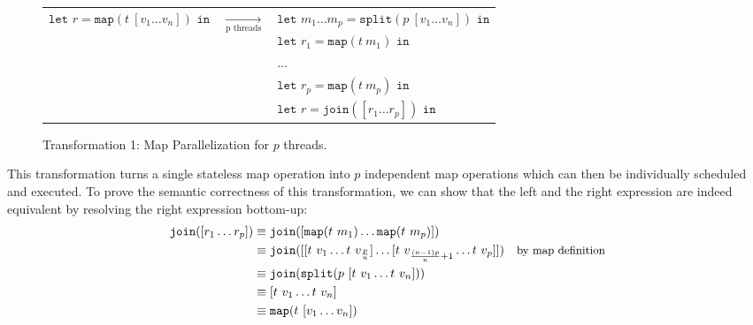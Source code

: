 \begin{figure}[h]
    \begin{tabular}{l c l}
        \multirow{5}{*}{$\texttt{let } r = \texttt{map} (t\ [v_1 \dots v_n]) \texttt{ in}$} & \multirow{5}{*}{$\underset{\text{p threads}}{\longrightarrow}$} & $\texttt{let } m_1 \dots m_p = \texttt{split} (p\ [v_1 \dots v_n]) \texttt{ in}$\\
                                                                                            &&\hspace*{.3cm} $\texttt{let } r_1 = \texttt{map} (t\ m_1) \texttt{ in}$\\
                                                                                            &&\hspace*{.6cm} $\dots$\\
                                                                                            &&\hspace*{.9cm} $\texttt{let } r_p = \texttt{map} (t\ m_p) \texttt{ in}$\\
                                                                                            &&\hspace*{1.2cm} $\texttt{let } r = \texttt{join} ([r_1 \dots r_p]) \texttt{ in}$\\
    \end{tabular}
    \caption{Transformation 1: Map Parallelization for $p$ threads.}%
    \label{fig:transformations:tf1}
\end{figure}

This transformation turns a single stateless map operation into $p$ independent map operations which can then be individually scheduled and executed.
To prove the semantic correctness of this transformation, we can show that the left and the right expression are indeed equivalent by resolving the right expression bottom-up:
\begin{align*}
    \texttt{join} ([r_1 \dots r_p]) &\equiv \texttt{join} ([\texttt{map} (t\ m_1) \dots \texttt{map} (t\ m_p)])\\
                                    &\equiv \texttt{join} ([[t\ v_1 \dots t\ v_{\frac{p}{n}}] \dots [t\ v_{\frac{(n-1) p}{n} + 1} \dots t\ v_p]])& \text{\small by map definition}\\
                                    &\equiv \texttt{join} (\texttt{split} (p\ [t\ v_1 \dots t\ v_n]))\\
                                    &\equiv [t\ v_1 \dots t\ v_n]\\
                                    &\equiv \texttt{map} (t\ [v_1 \dots v_n])
\end{align*}


